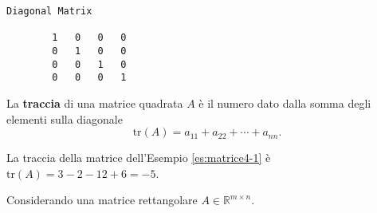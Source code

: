 \begin{defi}
\begin{itemize}
\begin{es}
\begin{lstlisting}[caption=generare una matrice identità in GNU/Octave]
        Diagonal Matrix

        1   0   0   0
        0   1   0   0
        0   0   1   0
        0   0   0   1
      \end{lstlisting}
    \end{es}
  \end{itemize}
\end{defi}
\begin{defi}
  \label{defi:matrice5}
  La \textbf{traccia} di una matrice quadrata $A$ è il numero dato dalla
  somma degli elementi sulla diagonale
  \begin{equation*}
    \mathrm{tr}(A)=a_{11}+a_{22}+\cdots+a_{nn}.
  \end{equation*}
\end{defi}
\begin{es}
  La traccia della matrice dell'Esempio \ref{es:matrice4-1} è
  $\mathrm{tr}(A)=3-2-12+6=-5$.
\end{es}
Considerando una matrice rettangolare $A\in\mathds{R}^{m\times n}$.
